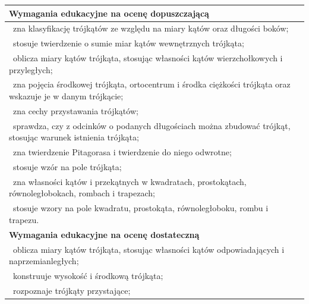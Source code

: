 \documentclass[12pt,a4paper]{article}
\begin{document}
	\begin{longtable}{|p{16cm}|}
		\hline
		
		\textbf{Wymagania edukacyjne na ocenę dopuszczającą} \\ \hline
		
		\textbullet\ zna klasyfikację trójkątów ze względu na miary kątów oraz długości boków; \\
		
		\textbullet\ stosuje twierdzenie o sumie miar kątów wewnętrznych trójkąta; \\
		
		\textbullet\ oblicza miary kątów trójkąta, stosując własności kątów wierzchołkowych i przyległych; \\
		
		\textbullet\ zna pojęcia środkowej trójkąta, ortocentrum i środka ciężkości trójkąta oraz wskazuje je w danym trójkącie; \\
		
		\textbullet\ zna cechy przystawania trójkątów; \\
		
		\textbullet\ sprawdza, czy z odcinków o podanych długościach można zbudować trójkąt, stosując warunek istnienia trójkąta; \\
		
		\textbullet\ zna twierdzenie Pitagorasa i twierdzenie do niego odwrotne; \\
		
		\textbullet\ stosuje wzór na pole trójkąta; \\
		
		\textbullet\ zna własności kątów i przekątnych w kwadratach, prostokątach, równoległobokach, rombach i trapezach; \\
		
		\textbullet\ stosuje wzory na pole kwadratu, prostokąta, równoległoboku, rombu i trapezu. \\ \hline
		
		\textbf{Wymagania edukacyjne na ocenę dostateczną} \\ \hline
		
		\textbullet\ oblicza miary kątów trójkąta, stosując własności kątów odpowiadających i naprzemianległych; \\
		
		\textbullet\ konstruuje wysokość i środkową trójkąta; \\
		
		\textbullet\ rozpoznaje trójkąty przystające; \\
		

\end{longtable}
\end{document}
